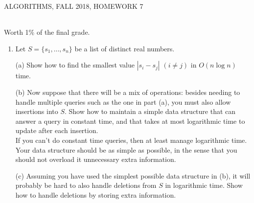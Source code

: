 \documentclass[12pt]{article}
\begin{document}
  
\pagestyle{empty}
 

\begin{center} ALGORITHMS,   FALL 2018, HOMEWORK 7
\end{center}
\\ 

\noindent Worth 1\% of the final grade.\\

\begin{enumerate}

 \item 
Let  $S = \{s_1, \ldots, s_n\}$ be a list of distinct real numbers. 


(a) Show how to find the smallest value $|s_i-s_j|$ $(i\neq j)$ in  $O(n\log n)$ time.   

(b) Now suppose that there will be a mix of operations: besides  needing to handle multiple queries such  as the one in part (a), you must also allow insertions into $S$.  
  Show how to maintain a simple data structure that can answer a query in constant time, and that takes at most logarithmic time to update after each insertion.  \\
  If you can't do constant time queries, then at least manage logarithmic time.  Your data structure should be as simple as possible, in the sense that you should not overload it unnecessary extra information.
    

(c) Assuming you have used the simplest possible data structure in (b), it will probably be hard to also handle deletions from $S$ in logarithmic time.
Show how to handle deletions by storing extra information. \\




\end{enumerate}
\end{document}
